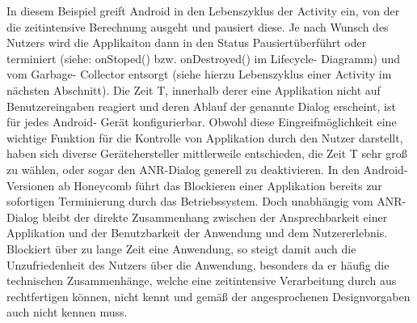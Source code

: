 \documentclass[12pt,oneside,a4paper,bibtotoc,liststotoc]{scrreprt}
\begin{document}
In diesem Beispiel greift Android in den Lebenszyklus der Activity ein, von der die zeitintensive Berechnung ausgeht und pausiert diese. Je nach Wunsch des Nutzers wird die Applikaiton dann in den Status \glqq Pausiert\grqq überführt oder terminiert (siehe: onStoped() bzw. onDestroyed() im Lifecycle- Diagramm) und vom Garbage- Collector entsorgt (siehe hierzu Lebenszyklus einer Activity im nächsten Abschnitt). Die Zeit T, innerhalb derer eine Applikation nicht auf Benutzereingaben reagiert und deren Ablauf der genannte Dialog erscheint, ist für jedes Android- Gerät konfigurierbar. Obwohl diese Eingreifmöglichkeit eine wichtige Funktion für die Kontrolle von Applikation durch den Nutzer darstellt, haben sich diverse Gerätehersteller mittlerweile entschieden, die Zeit T sehr groß zu wählen, oder sogar den ANR-Dialog generell zu deaktivieren. In den Android- Versionen ab Honeycomb führt das Blockieren einer Applikation bereits zur sofortigen Terminierung durch das Betriebssystem. Doch unabhängig vom ANR-Dialog bleibt der direkte Zusammenhang zwischen der Ansprechbarkeit einer Applikation und der Benutzbarkeit der Anwendung und dem Nutzererlebnis. Blockiert über zu lange Zeit eine Anwendung, so steigt damit auch die Unzufriedenheit des Nutzers über die Anwendung, besonders da er häufig die technischen Zusammenhänge, welche eine zeitintensive Verarbeitung durch aus rechtfertigen können, nicht kennt und gemäß der angesprochenen Designvorgaben auch nicht kennen muss.
\end{document}
